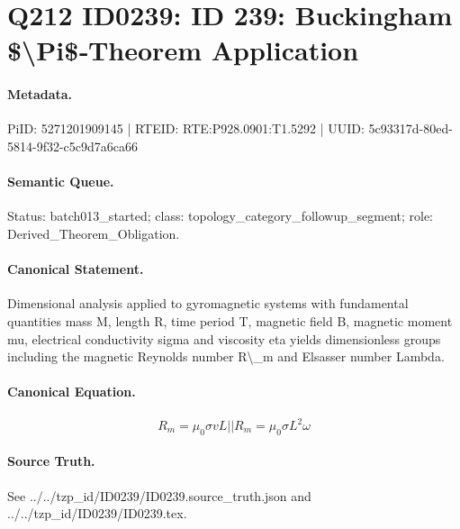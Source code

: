 \section*{Q212 ID0239: ID 239: Buckingham \$\textbackslash{}Pi\$‑Theorem Application}
\paragraph{Metadata.}
PiID: 5271201909145 | RTEID: RTE:P928.0901:T1.5292 | UUID: 5c93317d-80ed-5814-9f32-c5c9d7a6ca66

\paragraph{Semantic Queue.}
Status: batch013\_started; class: topology\_category\_followup\_segment; role: Derived\_Theorem\_Obligation.

\paragraph{Canonical Statement.}
Dimensional analysis applied to gyromagnetic systems with fundamental quantities mass M, length R, time period T, magnetic field B, magnetic moment mu, electrical conductivity sigma and viscosity eta yields dimensionless groups including the magnetic Reynolds number R\textbackslash{}\_m and Elsasser number Lambda.

\paragraph{Canonical Equation.}
\[
R_m=\mu_0\sigma vL || R_m=\mu_0\sigma L^2\omega
\]

\paragraph{Source Truth.}
See ../../tzp\_id/ID0239/ID0239.source\_truth.json and ../../tzp\_id/ID0239/ID0239.tex.
